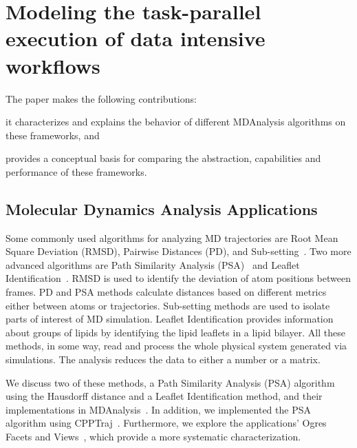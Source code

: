 \section{Modeling the task-parallel execution of data intensive workflows}
\label{sec:task-par}

The paper makes the following contributions: 
\begin{inparaenum}[i)]
    \item it characterizes and explains the behavior of different MDAnalysis algorithms on these frameworks, and
    \item provides a conceptual basis for comparing the abstraction, capabilities and performance of these frameworks.
\end{inparaenum}


\subsection{Molecular Dynamics Analysis Applications}
\label{use_cases}
Some commonly used algorithms for analyzing MD trajectories are Root Mean Square Deviation (RMSD), Pairwise Distances (PD), and Sub-setting~\cite{mura2014biomolecules}.
Two more advanced algorithms are Path Similarity Analysis (PSA)~\cite{seyler2015path} and Leaflet Identification~\cite{michaud2011mdanalysis}.
RMSD is used to identify the deviation of atom positions between frames.
PD and PSA methods calculate distances based on different metrics either between atoms or trajectories.
Sub-setting methods are used to isolate parts of interest of MD simulation.
Leaflet Identification provides information about groups of lipids by identifying the lipid leaflets in a lipid bilayer.
All these methods, in some way, read and process the whole physical system generated via simulations.
The analysis reduces the data to either a number or a matrix.

We discuss two of these methods, a Path Similarity Analysis (PSA) algorithm using the Hausdorff distance and a Leaflet Identification method, and their implementations in MDAnalysis~\cite{michaud2011mdanalysis,gowers2016mdanalysis}.
In addition, we implemented the PSA algorithm using CPPTraj~\cite{roe2013ptraj}.
Furthermore, we explore the applications' Ogres Facets and Views~\cite{fox2014towards}, which provide a more systematic characterization.

